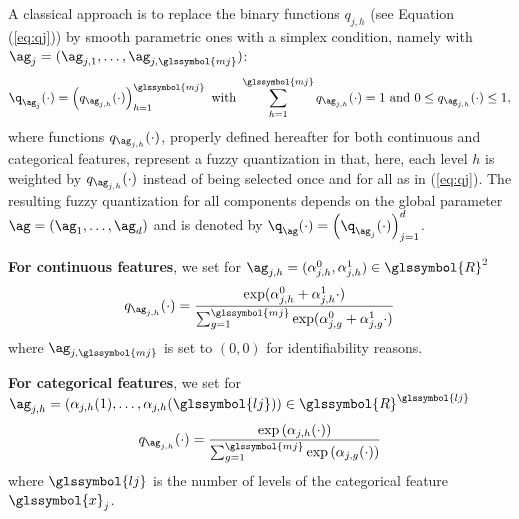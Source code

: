A classical approach is to replace the binary functions $q_{j,h}$ (see Equation (\ref{eq:qj}))  by smooth parametric ones  with a simplex condition, namely with $\ag_j=(\ag_{j,1},\ldots, \ag_{j,\glssymbol{mj}})$:
\begin{equation*}
    {\q_{\ag_j}(\cdot)=\left(q_{\ag_{j,h}}(\cdot)\right)_{h=1}^{\glssymbol{mj}} \text{ with } \sum_{h=1}^{\glssymbol{mj}}q_{\ag_{j,h}}(\cdot)=1 \text{ and } 0 \leq q_{\ag_{j,h}}(\cdot) \leq 1,}
\end{equation*}
where functions $q_{\ag_{j,h}}(\cdot)$, properly defined hereafter for both continuous and categorical features, represent a fuzzy quantization in that, here, each level $h$ is weighted by $q_{\ag_{j,h}}(\cdot)$ instead of being selected once and for all as in (\ref{eq:qj}). The resulting fuzzy quantization for all components depends on the global parameter $\ag = (\ag_1, \ldots, \ag_d)$ and is denoted by $\q_{\ag}(\cdot)=\left(\q_{\ag_j}(\cdot)\right)_{j=1}^d$. 




 {\bf For continuous features}, we set for $\ag_{j,h} = (\alpha^0_{j,h},\alpha^1_{j,h}) \in \glssymbol{R}^2$
\begin{equation} \label{eq:softmax}
q_{\ag_{j,h}}(\cdot) = \frac{\exp(\alpha^0_{j,h} + \alpha^1_{j,h}  \cdot)}{\sum_{g=1}^{\glssymbol{mj}} \exp(\alpha^0_{j,g} + \alpha^1_{j,g}  \cdot)}
\end{equation}
where $\ag_{j,\glssymbol{mj}}$ is set to $(0,0)$ for identifiability reasons.




{\bf For categorical features}, we set for $\ag_{j,h}=\left(\alpha_{j,h}(1),\ldots, \alpha_{j,h}(\glssymbol{lj})\right) \in \glssymbol{R}^{\glssymbol{lj}}$
\[q_{\ag_{j,h}}(\cdot) = \frac{\exp\left(\alpha_{j,h}(\cdot)\right)}{\sum_{g=1}^{\glssymbol{mj}} \exp\left(\alpha_{j,g}(\cdot)\right)}\]
where $\glssymbol{lj}$ is the number of levels of the categorical feature $\glssymbol{x}_j$.




